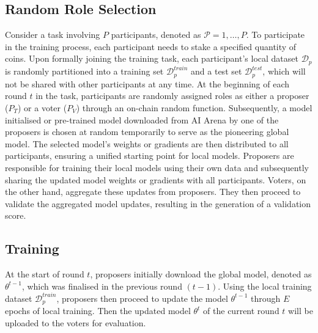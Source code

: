 \documentclass[conference]{IEEEtran}
\newcommand{\rui}[1]{{\color{black} #1}}
\begin{document}
\subsection{Random Role Selection} 
Consider a \FL task involving $P$ participants, denoted as $\mathcal{P} = {1, \ldots, P}$. To participate in the training process, each participant needs to stake a specified quantity of coins. \rui{Upon formally joining the training task, each participant's local dataset $\mathcal{D}_p$ is randomly partitioned into a training set $\mathcal{D}_p^{train}$ and a test set $\mathcal{D}_p^{test}$, which will not be shared with other participants at any time. At the beginning of each round $t$ in the \FL task, participants are randomly assigned roles as either a proposer ($P_T$) or a voter ($P_V$) through an on-chain random function. Subsequently, a model initialised or pre-trained model downloaded from AI Arena by one of the proposers is chosen at random temporarily to serve as the pioneering global model. The selected model's weights or gradients are then distributed to all participants, ensuring a unified starting point for local models. Proposers are responsible for training their local models using their own data and subsequently sharing the updated model weights or gradients with all participants. Voters, on the other hand, aggregate these updates from proposers. They then proceed to validate the aggregated model updates, resulting in the generation of a validation score.
}





\subsection{\FL Training} At the start of round $t$, proposers initially download the global model, denoted as $\theta^{t-1}$, which was finalised in the previous round $(t-1)$. Using the local training dataset $\mathcal{D}_p^{train}$, proposers then proceed to update the model $\theta^{t-1}$ through $E$ epochs of local training. Then the updated model $\theta^{t}$ of the current round $t$ will be uploaded to the voters for evaluation.
\end{document}
